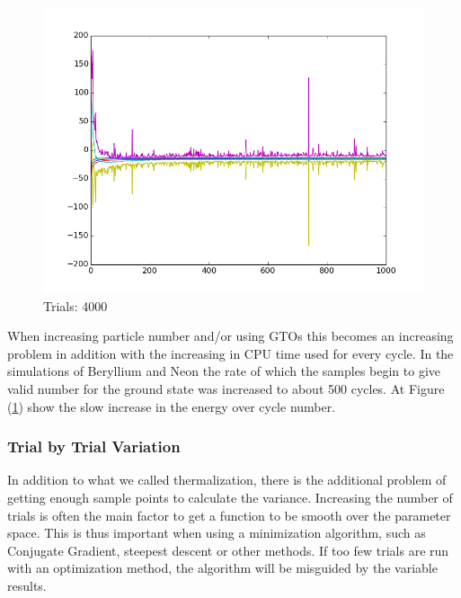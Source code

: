 \documentclass[twocolumn,fleqn,8pt]{article}  %
\begin{document}
\begin{figure}
	\includegraphics[width=\columnwidth]{../res/plot/beryllium_04/beryllium_04.png}
	\caption{Trials: 4000}
	\label{fig:beryllium_04}
\end{figure}
When increasing particle number and/or using GTOs this becomes an increasing problem
in addition with the increasing in CPU time used for every cycle. In the 
simulations of Beryllium and Neon the rate of which the samples begin to give
valid number for the ground state was increased to about 500 cycles. At 
Figure (\ref{fig:beryllium_04}) show the slow increase in the energy over cycle number. 

\subsubsection{Trial by Trial Variation}
In addition to what we called thermalization, there is the additional problem of getting 
enough sample points to calculate the variance. Increasing the number of trials is often
the main factor to get a function to be smooth over the parameter space. This is thus 
important when using a minimization algorithm, such as Conjugate Gradient, steepest descent
or other methods. If too few trials are run with an optimization method, the 
algorithm will be misguided by the variable results.
\end{document}
